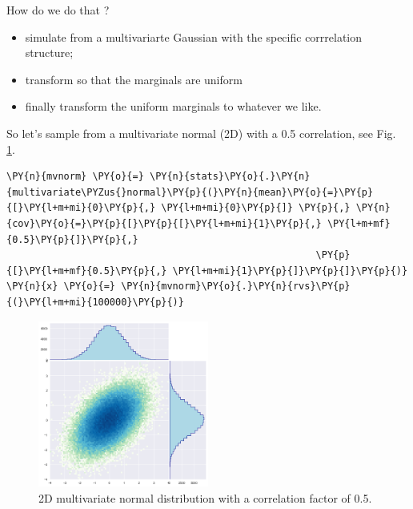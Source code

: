 How do we do that ?

\begin{itemize}
\tightlist
\item
  simulate from a multivariarte Gaussian with the specific corrrelation
  structure;
\item
  transform so that the marginals are uniform
\item
  finally transform the uniform marginals to whatever we like.
\end{itemize}

So let's sample from a multivariate normal (2D) with a 0.5 correlation, see Fig.~ \ref{fig:multivariate_with_correlation}.

\begin{tcolorbox}[breakable, size=fbox, boxrule=1pt, pad at break*=1mm,colback=cellbackground, colframe=cellborder]
\begin{Verbatim}[commandchars=\\\{\}]
\PY{n}{mvnorm} \PY{o}{=} \PY{n}{stats}\PY{o}{.}\PY{n}{multivariate\PYZus{}normal}\PY{p}{(}\PY{n}{mean}\PY{o}{=}\PY{p}{[}\PY{l+m+mi}{0}\PY{p}{,} \PY{l+m+mi}{0}\PY{p}{]} \PY{p}{,} \PY{n}{cov}\PY{o}{=}\PY{p}{[}\PY{p}{[}\PY{l+m+mi}{1}\PY{p}{,} \PY{l+m+mf}{0.5}\PY{p}{]}\PY{p}{,}
                                                      \PY{p}{[}\PY{l+m+mf}{0.5}\PY{p}{,} \PY{l+m+mi}{1}\PY{p}{]}\PY{p}{]}\PY{p}{)}
\PY{n}{x} \PY{o}{=} \PY{n}{mvnorm}\PY{o}{.}\PY{n}{rvs}\PY{p}{(}\PY{l+m+mi}{100000}\PY{p}{)}
\end{Verbatim}
\end{tcolorbox}

\begin{figure}[htb]
  \centering
  \includegraphics[width=0.5\textwidth]{copula_files/copula_15_0.png}
  \caption{2D multivariate normal distribution with a correlation factor of 0.5.}
  \label{fig:multivariate_with_correlation}
    \end{figure}
    
